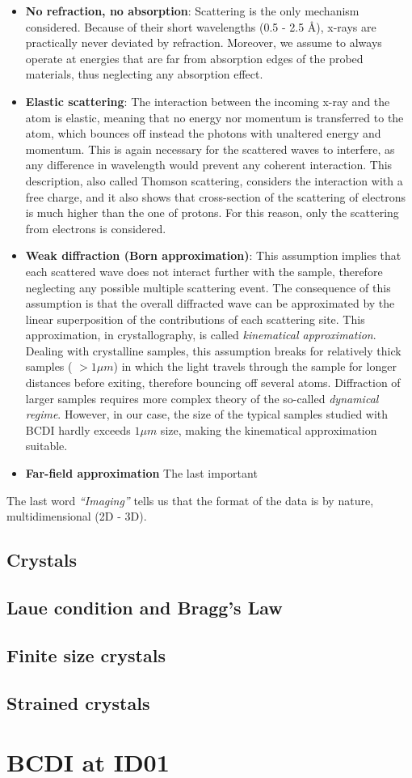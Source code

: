 \begin{itemize}
    \item \textbf{No refraction, no absorption}: Scattering is the only mechanism considered. Because of their short wavelengths
    (0.5 - 2.5 \AA), x-rays are practically never deviated by refraction. Moreover, we assume to always operate at energies that 
    are far from absorption edges of the probed materials, thus neglecting any absorption effect. 
    \item \textbf{Elastic scattering}: The interaction between the incoming x-ray and the atom is elastic, meaning that 
    no energy nor momentum is transferred to the atom, which bounces off instead the photons with unaltered energy and 
    momentum. This is again necessary for the scattered waves to interfere, as any difference in wavelength would 
    prevent any coherent interaction. This description, also called Thomson scattering, considers the interaction with a free charge, 
    and it also shows that cross-section of the scattering of electrons is much higher than the one of protons. 
    For this reason, only the scattering from electrons is considered. 
    \item \textbf{Weak diffraction (Born approximation)}: This assumption implies that each scattered wave does not interact 
    further with the sample, therefore neglecting any possible multiple scattering event. The consequence of this assumption 
    is that the overall diffracted wave can be approximated by the linear superposition of the contributions of each scattering site. 
    This approximation, in crystallography, is called \textit{kinematical approximation}. 
    Dealing with crystalline samples, this assumption breaks for relatively thick samples ( $ > 1 \mu m $) in which the 
    light travels through the sample for longer distances before exiting, therefore bouncing off several atoms. 
    Diffraction of larger samples requires more complex theory of the so-called \textit{dynamical regime}.
    However, in our case, the size of the typical samples studied with BCDI hardly exceeds $ 1 \mu m $ size, making the 
    kinematical approximation suitable. 
    \item \textbf{Far-field approximation} The last important 

\end{itemize}

The last word \textit{``Imaging''} tells us that the format of the data is by nature, multidimensional (2D - 3D). 

\subsection{Crystals}
\subsection{Laue condition and Bragg's Law} 
\subsection{Finite size crystals}
\subsection{Strained crystals}

\section{BCDI at ID01}\label{chp:phasing}
